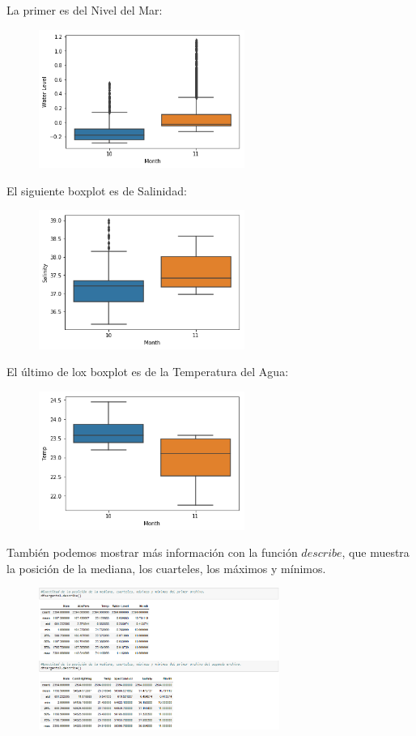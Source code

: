 \documentclass[a4paper]{article}
\begin{document}
La primer es del Nivel del Mar:
\begin{figure}[ht!]
 \centering
  \includegraphics[width=0.6\textwidth]{Boxplot1.png}
\end{figure}

El siguiente boxplot es de Salinidad:
\begin{figure}[ht!]
 \centering
  \includegraphics[width=0.6\textwidth]{Boxplot2.png}
\end{figure}

El último de lox boxplot es de la Temperatura del Agua:
\begin{figure}[ht!]
 \centering
  \includegraphics[width=0.6\textwidth]{Boxplot3.png}
\end{figure}

También podemos mostrar más información con la función $describe$, que muestra la posición de la mediana, los cuarteles, los máximos y mínimos. 
\begin{figure}[ht!]
 \centering
  \includegraphics[width=0.7\textwidth]{Describe.PNG}
\end{figure}
\end{document}

